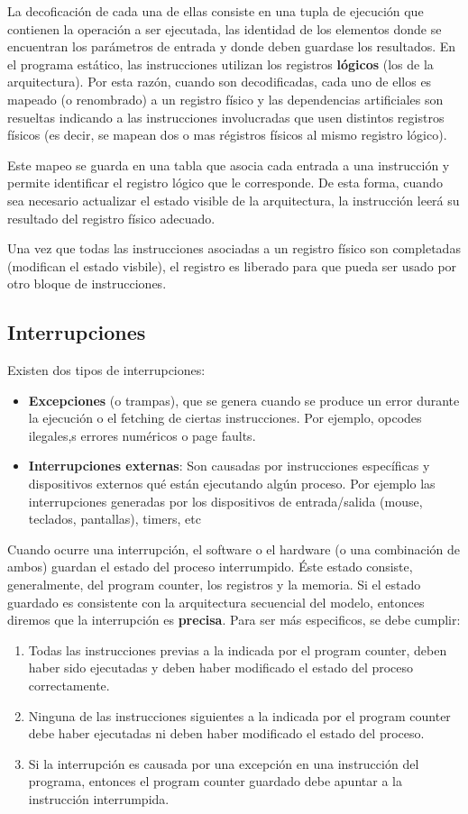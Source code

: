 La decoficación de cada una de ellas consiste en una tupla de ejecución que contienen la operación a ser ejecutada, las identidad de los elementos donde se encuentran los parámetros de entrada y donde deben guardase los resultados. En el programa estático, las instrucciones utilizan los registros \textbf{lógicos} (los de la arquitectura). Por esta razón, cuando son decodificadas, cada uno de ellos es mapeado (o renombrado) a un registro físico y las dependencias artificiales son resueltas indicando a las instrucciones involucradas que usen distintos registros físicos (es decir, se mapean dos o mas régistros físicos al mismo registro lógico).

Este mapeo se guarda en una tabla que asocia cada entrada a una instrucción y permite identificar el registro lógico que le corresponde. De esta forma, cuando sea necesario actualizar el estado visible de la arquitectura, la instrucción leerá su resultado del registro físico adecuado.

Una vez que todas las instrucciones asociadas a un registro físico son completadas (modifican el estado visbile), el registro es liberado para que pueda ser usado por otro bloque de instrucciones.

\subsection{Interrupciones}
Existen dos tipos de interrupciones:
\begin{itemize}
	\item \textbf{Excepciones} (o trampas), que se genera cuando se produce un error durante la ejecución o el fetching de ciertas instrucciones. Por ejemplo, opcodes ilegales,s errores numéricos o page faults.
	\item \textbf{Interrupciones externas}: Son causadas por instrucciones específicas y dispositivos externos qué están ejecutando algún proceso. Por ejemplo las interrupciones generadas por los dispositivos de entrada/salida (mouse, teclados, pantallas), timers, etc
\end{itemize}

Cuando ocurre una interrupción, el software o el hardware (o una combinación de ambos) guardan el estado del proceso interrumpido. Éste estado consiste, generalmente, del program counter, los registros y la memoria. Si el estado guardado es consistente con la arquitectura secuencial del modelo, entonces diremos que la interrupción es \textbf{precisa}. Para ser más especificos, se debe cumplir:
\begin{enumerate}
	\item Todas las instrucciones previas a la indicada por el program counter, deben haber sido ejecutadas y deben haber modificado el estado del proceso correctamente.
	\item Ninguna de las instrucciones siguientes a la indicada por el program counter debe haber ejecutadas ni deben haber modificado el estado del proceso.
	\item Si la interrupción es causada por una excepción en una instrucción del programa, entonces el program counter guardado debe apuntar a la instrucción interrumpida.
\end{enumerate}


